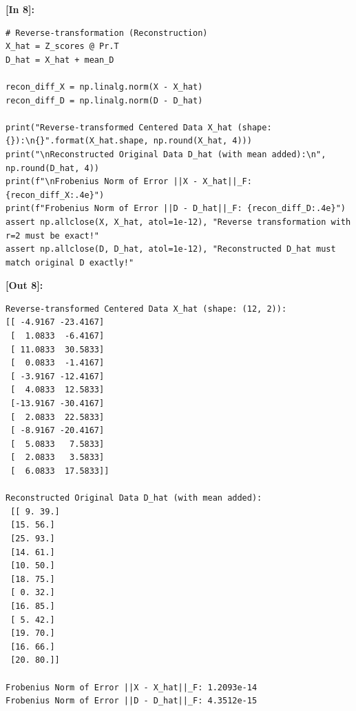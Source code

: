 \vspace{0.6em}
\noindent\textbf{\small [In 8]:}
\begin{lstlisting}[style=pycode]
# Reverse-transformation (Reconstruction)
X_hat = Z_scores @ Pr.T
D_hat = X_hat + mean_D

recon_diff_X = np.linalg.norm(X - X_hat)
recon_diff_D = np.linalg.norm(D - D_hat)

print("Reverse-transformed Centered Data X_hat (shape: {}):\n{}".format(X_hat.shape, np.round(X_hat, 4)))
print("\nReconstructed Original Data D_hat (with mean added):\n", np.round(D_hat, 4))
print(f"\nFrobenius Norm of Error ||X - X_hat||_F: {recon_diff_X:.4e}")
print(f"Frobenius Norm of Error ||D - D_hat||_F: {recon_diff_D:.4e}")
assert np.allclose(X, X_hat, atol=1e-12), "Reverse transformation with r=2 must be exact!"
assert np.allclose(D, D_hat, atol=1e-12), "Reconstructed D_hat must match original D exactly!"
\end{lstlisting}
\noindent\textbf{\small [Out 8]:}
\begin{lstlisting}[style=output]
Reverse-transformed Centered Data X_hat (shape: (12, 2)):
[[ -4.9167 -23.4167]
 [  1.0833  -6.4167]
 [ 11.0833  30.5833]
 [  0.0833  -1.4167]
 [ -3.9167 -12.4167]
 [  4.0833  12.5833]
 [-13.9167 -30.4167]
 [  2.0833  22.5833]
 [ -8.9167 -20.4167]
 [  5.0833   7.5833]
 [  2.0833   3.5833]
 [  6.0833  17.5833]]

Reconstructed Original Data D_hat (with mean added):
 [[ 9. 39.]
 [15. 56.]
 [25. 93.]
 [14. 61.]
 [10. 50.]
 [18. 75.]
 [ 0. 32.]
 [16. 85.]
 [ 5. 42.]
 [19. 70.]
 [16. 66.]
 [20. 80.]]

Frobenius Norm of Error ||X - X_hat||_F: 1.2093e-14
Frobenius Norm of Error ||D - D_hat||_F: 4.3512e-15
\end{lstlisting}


